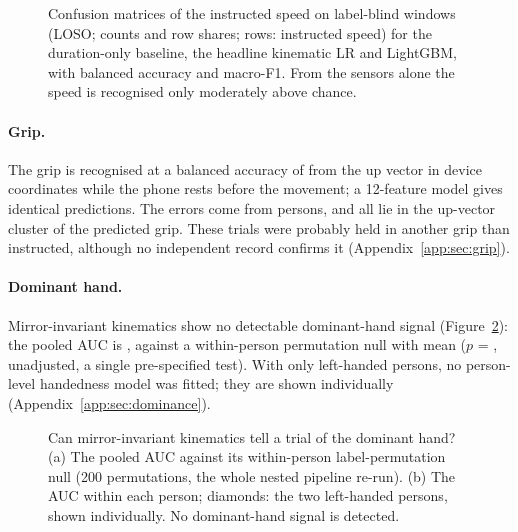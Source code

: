\begin{figure}[htbp]
\centering
{}
\caption{Confusion matrices of the instructed speed on label-blind windows (LOSO; counts and row shares; rows:
instructed speed) for the duration-only baseline, the headline kinematic LR and LightGBM, with balanced accuracy
and macro-F1. From the sensors alone the speed is recognised only moderately above chance.}
\label{fig:SEC_02_speed_confusion}
\end{figure}

\paragraph{Grip.} The grip is recognised at a balanced accuracy of  from the up vector in
device coordinates while the phone rests before the movement; a 12-feature model gives identical predictions. The
 errors come from  persons, and all
 lie in the up-vector cluster of the predicted grip. These trials were
probably held in another grip than instructed, although no independent record confirms it
(Appendix~\ref{app:sec:grip}).

\paragraph{Dominant hand.} Mirror-invariant kinematics show no detectable dominant-hand signal
(Figure~\ref{fig:SEC_06_dominance_auc}): the pooled AUC is , against a within-person permutation
null with mean  ($p$ = , unadjusted, a single pre-specified test). With only  left-handed
persons, no person-level handedness model was fitted; they are shown individually
(Appendix~\ref{app:sec:dominance}).

\begin{figure}[htbp]
\centering
{}
\caption{Can mirror-invariant kinematics tell a trial of the dominant hand? (a) The pooled AUC against its
within-person label-permutation null (200 permutations, the whole nested pipeline re-run). (b) The AUC within each
person; diamonds: the two left-handed persons, shown individually. No dominant-hand signal is detected.}
\label{fig:SEC_06_dominance_auc}
\end{figure}

